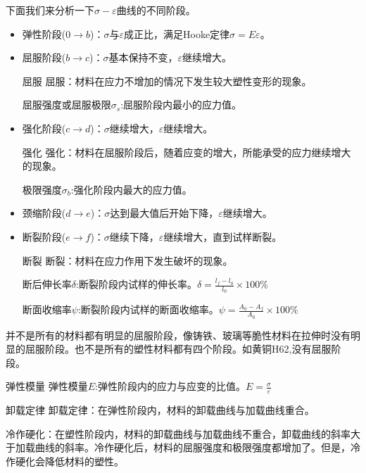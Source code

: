 下面我们来分析一下$\sigma-\varepsilon$曲线的不同阶段。
\begin{itemize}
	\item 弹性阶段($0\to b$)：$\sigma$与$\varepsilon$成正比，满足Hooke定律$ \sigma = E \varepsilon $。
	\item 屈服阶段($b\to c$)：$\sigma$基本保持不变，$\varepsilon$继续增大。
	\begin{mydefinition}{屈服}
		屈服：材料在应力不增加的情况下发生较大塑性变形的现象。

		屈服强度或屈服极限$\sigma_s$:屈服阶段内最小的应力值。
	\end{mydefinition}
	\item 强化阶段($c\to d$)：$\sigma$继续增大，$\varepsilon$继续增大。
	\begin{mydefinition}{强化}
	强化：材料在屈服阶段后，随着应变的增大，所能承受的应力继续增大的现象。

	极限强度$\sigma_b$:强化阶段内最大的应力值。 
	\end{mydefinition}
	\item 颈缩阶段($d\to e$)：$\sigma$达到最大值后开始下降，$\varepsilon$继续增大。
	\item 断裂阶段($e\to f$)：$\sigma$继续下降，$\varepsilon$继续增大，直到试样断裂。
	\begin{mydefinition}{断裂}
		断裂：材料在应力作用下发生破坏的现象。

		断后伸长率$\delta$:断裂阶段内试样的伸长率。$\delta=\frac{l_f-l_0}{l_0}\times 100\%$

		断面收缩率$\psi$:断裂阶段内试样的断面收缩率。$\psi=\frac{A_0-A_f}{A_0}\times 100\%$
	\end{mydefinition}
	
\end{itemize}
\begin{remark}
	并不是所有的材料都有明显的屈服阶段，像铸铁、玻璃等脆性材料在拉伸时没有明显的屈服阶段。也不是所有的塑性材料都有四个阶段。如黄铜H62,没有屈服阶段。
\end{remark}
\begin{mydefinition}{弹性模量}
	弹性模量$E$:弹性阶段内的应力与应变的比值。$E=\frac{\sigma}{\varepsilon}$
\end{mydefinition}
\begin{myTheorem}{卸载定律}
	卸载定律：在弹性阶段内，材料的卸载曲线与加载曲线重合。

	冷作硬化：在塑性阶段内，材料的卸载曲线与加载曲线不重合，卸载曲线的斜率大于加载曲线的斜率。冷作硬化后，材料的屈服强度和极限强度都增加了。但是，冷作硬化会降低材料的塑性。
\end{myTheorem}

